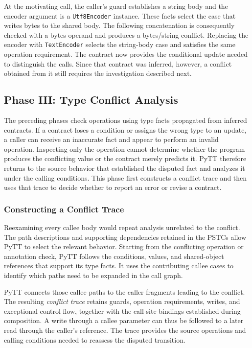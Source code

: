 At the motivating call, the caller's guard establishes a string body
and the encoder argument is a \texttt{Utf8Encoder} instance. These facts
select the case that writes bytes to the shared body. The following
concatenation is consequently checked with a bytes operand and produces
a bytes/string conflict. Replacing the encoder with
\texttt{TextEncoder} selects the string-body case and satisfies the same
operation requirement. The contract now provides the conditional update
needed to distinguish the calls. Since that contract was inferred,
however, a conflict obtained from it still requires the investigation
described next.

\subsection{Phase III: Type Conflict Analysis}
\label{sec:conflict-analysis}

The preceding phases check operations using type facts propagated from
inferred contracts. If a contract loses a condition or assigns the wrong
type to an update, a caller can receive an inaccurate fact and appear
to perform an invalid operation. Inspecting only the operation cannot
determine whether the program produces the conflicting value or the
contract merely predicts it. PyTT therefore returns to the source
behavior that established the disputed fact and analyzes it under the
calling conditions. This phase first constructs a conflict trace and
then uses that trace to decide whether to report an error or revise a
contract.

\subsubsection{Constructing a Conflict Trace}

Reexamining every callee body would repeat analysis unrelated to the
conflict. The path descriptions and supporting dependencies retained in
the PSTCs allow PyTT to select the relevant behavior. Starting from the
conflicting operation or annotation check, PyTT follows the conditions,
values, and shared-object references that support its type facts. It
uses the contributing callee cases to identify which paths need to be
expanded in the call graph.

PyTT connects those callee paths to the caller fragments leading to the
conflict. The resulting \emph{conflict trace} retains guards, operation
requirements, writes, and exceptional control flow, together with the
call-site bindings established during composition. A write through a
callee parameter can thus be followed to a later read through the
caller's reference. The trace provides the source operations and calling
conditions needed to reassess the disputed transition.

